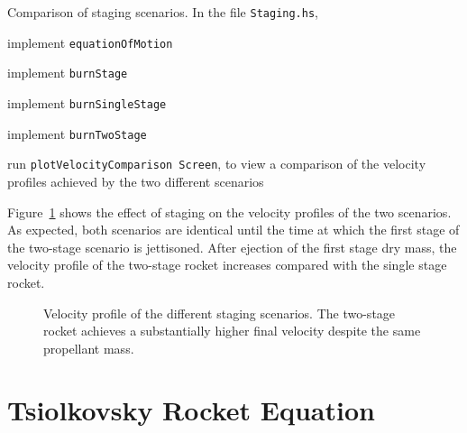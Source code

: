 \documentclass[12pt,openany]{book}
\newcommand{\filename}[1]{\texttt{#1}}  %
\newcommand{\code}[1]{\texttt{#1}}      %
\begin{document}
\begin{problem}[label=staging]{Comparison of staging scenarios.}
  In the file \filename{Staging.hs},
  \begin{probitemize}
  \item implement \code{equationOfMotion}
  \item implement \code{burnStage}
  \item implement \code{burnSingleStage}
  \item implement \code{burnTwoStage}
  \item run \code{plotVelocityComparison Screen}, to view a comparison of the velocity profiles achieved by the two different scenarios
  \end{probitemize}
\end{problem}

Figure~\ref{fig:staging-velocity-comparison} shows the effect of staging on the velocity profiles of the two scenarios. As expected, both scenarios are identical until the time at which the first stage of the two-stage scenario is jettisoned. After ejection of the first stage dry mass, the velocity profile of the two-stage rocket increases compared with the single stage rocket.

\begin{figure}[htbp]
  \resizebox{\textwidth}{!}{}
  \caption{Velocity profile of the different staging scenarios. The two-stage rocket achieves a substantially higher final velocity despite the same propellant mass.}
  \label{fig:staging-velocity-comparison}
\end{figure}

\section{Tsiolkovsky Rocket Equation}


\printunsrtglossary[type=symbols,style=long]

\clearpage{}
{}


\end{document}
